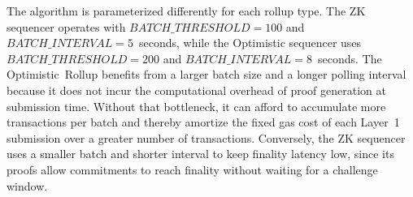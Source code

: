 The algorithm is parameterized differently for each rollup type. The ZK sequencer operates with $\textit{BATCH\_THRESHOLD} = 100$ and $\textit{BATCH\_INTERVAL} = 5$~seconds, while the Optimistic sequencer uses $\textit{BATCH\_THRESHOLD} = 200$ and $\textit{BATCH\_INTERVAL} = 8$~seconds. The Optimistic~Rollup benefits from a larger batch size and a longer polling interval because it does not incur the computational overhead of proof generation at submission time. Without that bottleneck, it can afford to accumulate more transactions per batch and thereby amortize the fixed gas cost of each Layer~1 submission over a greater number of transactions. Conversely, the ZK sequencer uses a smaller batch and shorter interval to keep finality latency low, since its proofs allow commitments to reach finality without waiting for a challenge window.
